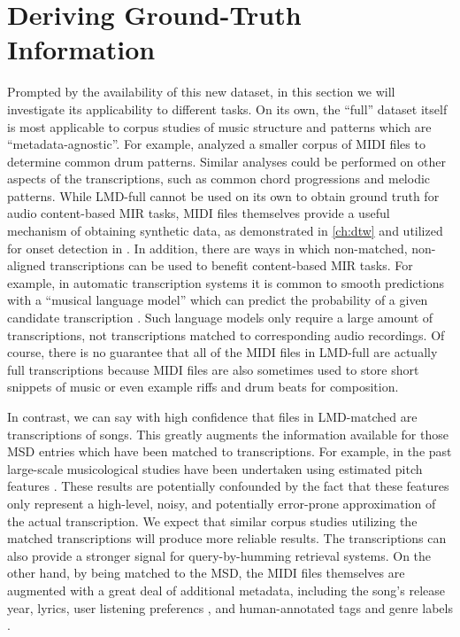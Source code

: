 \section{Deriving Ground-Truth Information}
\label{sec:deriving}

Prompted by the availability of this new dataset, in this section we will investigate its applicability to different tasks.
On its own, the ``full'' dataset itself is most applicable to corpus studies of music structure and patterns which are ``metadata-agnostic''.
For example, \cite{mauch2012corpus} analyzed a smaller corpus of MIDI files to determine common drum patterns.
Similar analyses could be performed on other aspects of the transcriptions, such as common chord progressions and melodic patterns.
While LMD-full cannot be used on its own to obtain ground truth for audio content-based MIR tasks, MIDI files themselves provide a useful mechanism of obtaining synthetic data, as demonstrated in \cref{ch:dtw} and utilized for onset detection in \cite{bello2005tutorial}.
In addition, there are ways in which non-matched, non-aligned transcriptions can be used to benefit content-based MIR tasks.
For example, in automatic transcription systems it is common to smooth predictions with a ``musical language model'' which can predict the probability of a given candidate transcription \cite{poliner2007discriminative,sigtia2015end}.
Such language models only require a large amount of transcriptions, not transcriptions matched to corresponding audio recordings.
Of course, there is no guarantee that all of the MIDI files in LMD-full are actually full transcriptions because MIDI files are also sometimes used to store short snippets of music or even example riffs and drum beats for composition.

In contrast, we can say with high confidence that files in LMD-matched are transcriptions of songs.
This greatly augments the information available for those MSD entries which have been matched to transcriptions.
For example, in the past large-scale musicological studies have been undertaken using estimated pitch features \cite{serra2012measuring,bertin2010clustering}.
These results are potentially confounded by the fact that these features only represent a high-level, noisy, and potentially error-prone approximation of the actual transcription.
We expect that similar corpus studies utilizing the matched transcriptions will produce more reliable results.
The transcriptions can also provide a stronger signal for query-by-humming retrieval systems.
On the other hand, by being matched to the MSD, the MIDI files themselves are augmented with a great deal of additional metadata, including the song's release year, lyrics, user listening preferencs \cite{jansson2015this}, and human-annotated tags and genre labels \cite{schreiber2015improving}.


